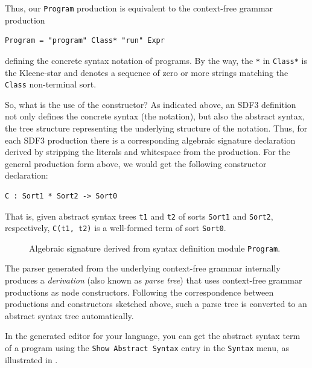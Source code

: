 Thus, our \texttt{Program} production is equivalent to the context-free grammar
production

\begin{lstlisting}[language=SDF]
  Program = "program" Class* "run" Expr
\end{lstlisting}

defining the concrete syntax notation of programs. By the way, the \texttt{*} in
\texttt{Class*} is the Kleene-star and denotes a sequence of zero or more
strings matching the \texttt{Class} non-terminal sort.

So, what is the use of the constructor? As indicated above, an SDF3 definition
not only defines the concrete syntax (the notation), but also the abstract
syntax, the tree structure representing the underlying structure of the
notation. Thus, for each SDF3 production there is a corresponding algebraic
signature declaration derived by stripping the literals and whitespace from the
production. For the general production form above, we would get the following
constructor declaration:

\begin{lstlisting}[language=Stratego]
  C : Sort1 * Sort2 -> Sort0
\end{lstlisting}

That is, given abstract syntax trees \texttt{t1} and \texttt{t2} of sorts
\texttt{Sort1} and \texttt{Sort2}, respectively, \texttt{C(t1, t2)} is a
well-formed term of sort \texttt{Sort0}.

\begin{figure}[t]

\caption{Algebraic signature derived from syntax definition module
\texttt{Program}.}
\end{figure}

The parser generated from the underlying context-free grammar internally
produces a \emph{derivation} (also known as \emph{parse tree}) that uses
context-free grammar productions as node constructors. Following the
correspondence between productions and constructors sketched above, such a parse
tree is converted to an abstract syntax tree automatically.

In the generated editor for your language, you can get the abstract syntax term
of a program using the \texttt{Show Abstract Syntax} entry in the
\texttt{Syntax} menu, as illustrated in .

